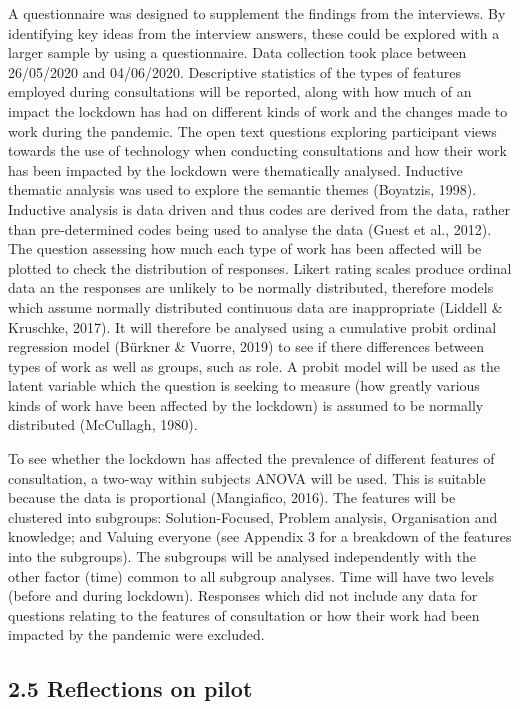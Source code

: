 \documentclass[
  english,
  man]{apa}
\begin{document}
A questionnaire was designed to supplement the findings from the interviews. By identifying key ideas from the interview answers, these could be explored with a larger sample by using a questionnaire. Data collection took place between 26/05/2020 and 04/06/2020. Descriptive statistics of the types of features employed during consultations will be reported, along with how much of an impact the lockdown has had on different kinds of work and the changes made to work during the pandemic. The open text questions exploring participant views towards the use of technology when conducting consultations and how their work has been impacted by the lockdown were thematically analysed. Inductive thematic analysis was used to explore the semantic themes (Boyatzis, 1998). Inductive analysis is data driven and thus codes are derived from the data, rather than pre-determined codes being used to analyse the data (Guest et al., 2012). The question assessing how much each type of work has been affected will be plotted to check the distribution of responses. Likert rating scales produce ordinal data an the responses are unlikely to be normally distributed, therefore models which assume normally distributed continuous data are inappropriate (Liddell \& Kruschke, 2017). It will therefore be analysed using a cumulative probit ordinal regression model (Bürkner \& Vuorre, 2019) to see if there differences between types of work as well as groups, such as role. A probit model will be used as the latent variable which the question is seeking to measure (how greatly various kinds of work have been affected by the lockdown) is assumed to be normally distributed (McCullagh, 1980).

To see whether the lockdown has affected the prevalence of different features of consultation, a two-way within subjects ANOVA will be used. This is suitable because the data is proportional (Mangiafico, 2016). The features will be clustered into subgroups: Solution-Focused, Problem analysis, Organisation and knowledge; and Valuing everyone (see Appendix 3 for a breakdown of the features into the subgroups). The subgroups will be analysed independently with the other factor (time) common to all subgroup analyses. Time will have two levels (before and during lockdown). Responses which did not include any data for questions relating to the features of consultation or how their work had been impacted by the pandemic were excluded.

\hypertarget{reflections-on-pilot}{%
\subsection{2.5 Reflections on pilot}\label{reflections-on-pilot}}
\end{document}
